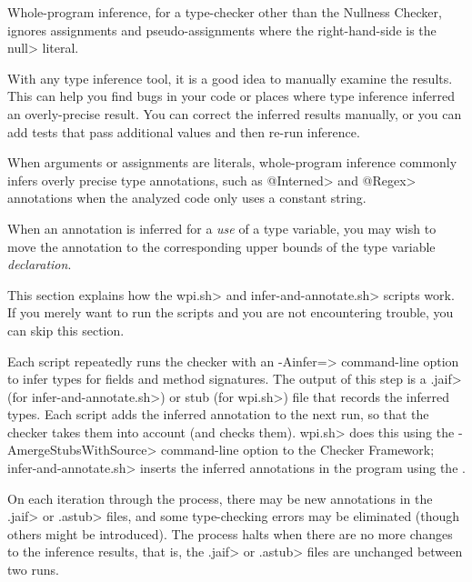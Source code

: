 Whole-program inference, for a type-checker other than the Nullness Checker,
ignores assignments and pseudo-assignments where the right-hand-side is the \<null> literal.



With any type inference tool, it is a good idea to manually examine the
results.  This can help you find bugs in your code or places where type
inference inferred an overly-precise result.
You can correct the inferred results manually, or you can
add tests that pass additional values and then re-run inference.

When arguments or assignments are literals, whole-program inference
commonly infers overly precise type annotations, such as \<@Interned> and
\<@Regex> annotations when the analyzed code only uses a constant string.

When an annotation is inferred for a \emph{use} of a type variable,
you may wish to move the annotation
to the corresponding upper bounds of the type variable \emph{declaration}.



This section explains how the \<wpi.sh> and \<infer-and-annotate.sh> scripts work.  If you
merely want to run the scripts and you are not encountering trouble, you can
skip this section.

Each script repeatedly runs the checker with an \<-Ainfer=> command-line option to infer
types for fields and method signatures.  The output of this step
is a \<.jaif> (for \<infer-and-annotate.sh>) or stub (for \<wpi.sh>) file that records the inferred types.
Each script adds the inferred annotation to the next run, so that the checker takes them into
account (and checks them). \<wpi.sh> does this using the \<-AmergeStubsWithSource> command-line
option to the Checker Framework; \<infer-and-annotate.sh> inserts the inferred annotations in the program using the
.

On each
iteration through the process, there may be new annotations in the \<.jaif> or \<.astub>
files, and some type-checking errors may be eliminated (though others might
be introduced).
The process halts when there are no more changes to the inference results,
that is, the \<.jaif> or \<.astub> files are unchanged between two runs.

